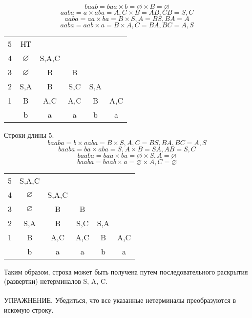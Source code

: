 \documentclass{article}
\begin{document}
$$baab = baa\times b = \varnothing \times B = \varnothing$$
$$aaba = a\times aba = A,C \times B = AB, CB = S, C$$
$$aaba = aa\times ba = B \times S,A = BS, BA = A$$
$$aaba = aab\times a = B \times A,C = BA, BC = A,S$$
\begin{center}
    \begin{tabular}{ c|c c c c c }
    5 & НТ  \\ 
    4 & $\varnothing$ & S,A,C   \\  
    3 & $\varnothing$ & B & B   \\  
    2 & S,A & B & S,C & S,A  \\  
    1 & B & A,C & A,C & B & A,C  \\
    \hline
      & b  &  a &  a & b  &  a 
    \end{tabular}
\end{center}
Строки длины 5. 
$$baaba = b\times aaba = B \times S,A,C = BS, BA, BC = A, S$$
$$baaba = ba\times aba = S,A \times B = SA, AB = S,C$$
$$baaba = baa\times ba = \varnothing \times S,A = \varnothing$$
$$baaba = baab\times a = \varnothing \times A,C = \varnothing$$
\begin{center}
    \begin{tabular}{ c|c c c c c }
    5 & S,A,C  \\ 
    4 & $\varnothing$ & S,A,C   \\  
    3 & $\varnothing$ & B & B   \\  
    2 & S,A & B & S,C & S,A  \\  
    1 & B & A,C & A,C & B & A,C  \\
    \hline
      & b  &  a &  a & b  &  a 
    \end{tabular}
\end{center}
Таким образом, строка может быть получена путем последовательного раскрытия
(развертки) нетерминалов S, A, C.\\\\
УПРАЖНЕНИЕ. 
Убедиться, что все указанные нетерминалы преобразуются в искомую строку. 
\end{document}
